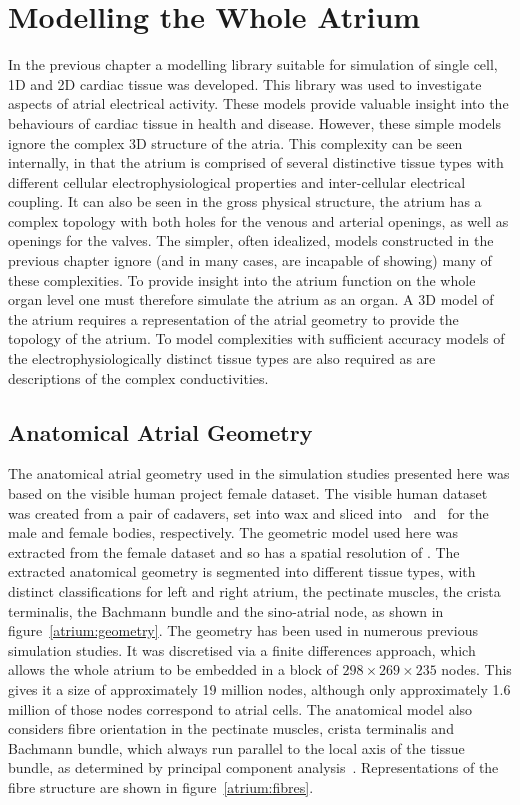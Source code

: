 \chapter{Modelling the Whole Atrium}

In the previous chapter a modelling library suitable for simulation of single
cell, 1D and 2D cardiac tissue was developed.
This library was used to investigate aspects of atrial electrical activity.
These models provide valuable insight into the behaviours of cardiac tissue in health
and disease.
However, these simple models ignore the complex 3D structure of the atria.
This complexity can be seen internally, in that the atrium is comprised of several
distinctive tissue types with different cellular electrophysiological properties
and inter-cellular electrical coupling.
It can also be seen in the gross physical structure, the atrium has a complex
topology with both holes for the venous and arterial openings, as well as
openings for the valves.
The simpler, often idealized, models constructed in the previous chapter
ignore (and in many cases, are incapable of showing) many of these complexities.
To provide insight into the atrium function on the whole organ level one must
therefore simulate the atrium as an organ.
A 3D model of the atrium requires a representation of the atrial geometry to
provide the topology of the atrium.
To model complexities with sufficient accuracy models of the
electrophysiologically distinct tissue types are also required as are
descriptions of the complex conductivities.


\section{Anatomical Atrial Geometry}
\label{atrium:sec:geometry}

The anatomical atrial geometry used in the simulation studies presented here was based on
the visible human project female dataset.
The visible human dataset was created from a pair of cadavers, set into wax and
sliced into \ and \ for the male and female bodies, respectively.
The geometric model used here was extracted from the female dataset and so has a
spatial resolution of .
The extracted anatomical geometry is segmented into different tissue types,
with distinct classifications for left and right atrium, the pectinate muscles,
the crista terminalis, the Bachmann bundle and the sino-atrial node, as shown in
figure~\ref{atrium:geometry}.
The geometry has been used in numerous previous simulation studies.
It was discretised via a finite differences approach, which
allows the whole atrium to be embedded in a block of $298\times269\times235$
nodes.
This gives it a size of approximately 19 million nodes, although only
approximately 1.6 million of those nodes correspond to atrial cells.
The anatomical model also considers fibre orientation in the pectinate muscles,
crista terminalis and Bachmann bundle, which always run parallel to the local
axis of the tissue bundle, as determined by principal component
analysis~\cite{Seemann2006}.
Representations of the fibre structure are shown in figure~\ref{atrium:fibres}.

